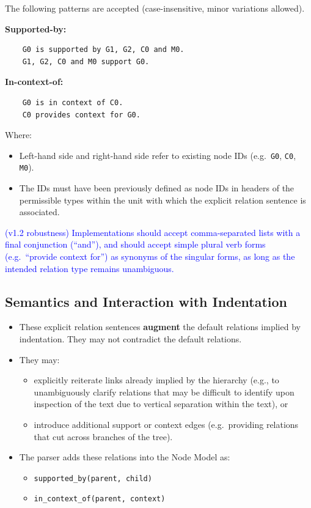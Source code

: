 \documentclass[11pt]{article}
\begin{document}
The following patterns are accepted (case-insensitive, minor variations allowed).

\textbf{Supported-by:}
\begin{verbatim}
    G0 is supported by G1, G2, C0 and M0.
    G1, G2, C0 and M0 support G0.
\end{verbatim}

\textbf{In-context-of:}
\begin{verbatim}
    G0 is in context of C0.
    C0 provides context for G0.
\end{verbatim}

Where:
\begin{itemize}[leftmargin=2em]
  \item Left-hand side and right-hand side refer to existing node IDs (e.g.\ \texttt{G0}, \texttt{C0}, \texttt{M0}).
  \item The IDs must have been previously defined as node IDs in headers of the permissible types within the unit with which the explicit relation sentence is associated.
\end{itemize}

\textcolor{blue}{(v1.2 robustness) Implementations should accept comma-separated lists with a final conjunction (``and''), and should accept simple plural verb forms (e.g.\ ``provide context for'') as synonyms of the singular forms, as long as the intended relation type remains unambiguous.}

\subsection{Semantics and Interaction with Indentation}

\begin{itemize}[leftmargin=2em]
  \item These explicit relation sentences \textbf{augment} the default relations implied by indentation. They may not contradict the default relations.
  \item They may:
  \begin{itemize}[leftmargin=1.5em]
    \item explicitly reiterate links already implied by the hierarchy (e.g., to unambiguously clarify relations that may be difficult to identify upon inspection of the text due to vertical separation within the text), or
    \item introduce additional support or context edges (e.g.\ providing relations that cut across branches of the tree).
  \end{itemize}
  \item The parser adds these relations into the Node Model as:
  \begin{itemize}[leftmargin=1.5em]
    \item \texttt{supported\_by(parent, child)}
    \item \texttt{in\_context\_of(parent, context)}
  \end{itemize}
\end{itemize}
\end{document}
